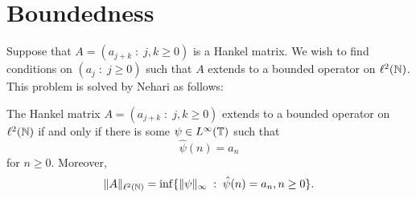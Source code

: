 \documentclass{unswmaths}
\begin{document}
\section*{Boundedness}
    Suppose that $A = (a_{j+k}\;:\;j,k\geq 0)$ is a Hankel matrix. We wish to find
    conditions on $(a_j\;:\;j\geq 0)$ such that $A$ extends to a bounded operator on $\ell^2(\mathbb{N})$. 
    This problem is solved by Nehari %
    as follows:
    \begin{theorem}
        The Hankel matrix $A = (a_{j+k}\;:\;j,k\geq 0)$ extends to a bounded operator on $\ell^2(\mathbb{N})$
        if and only if there is some $\psi \in L^\infty(\mathbb{T})$ such that
        \begin{equation*}
            \hat{\psi}(n) = a_n
        \end{equation*}
        for $n\geq 0$.
        Moreover,
        \begin{equation*}
            \|A\|_{\ell^2(\mathbb{N})} = \inf\{\|\psi\|_{\infty}\;:\;\hat{\psi}(n) = a_n,n\geq 0\}.
        \end{equation*}
    \end{theorem}
\end{document}
